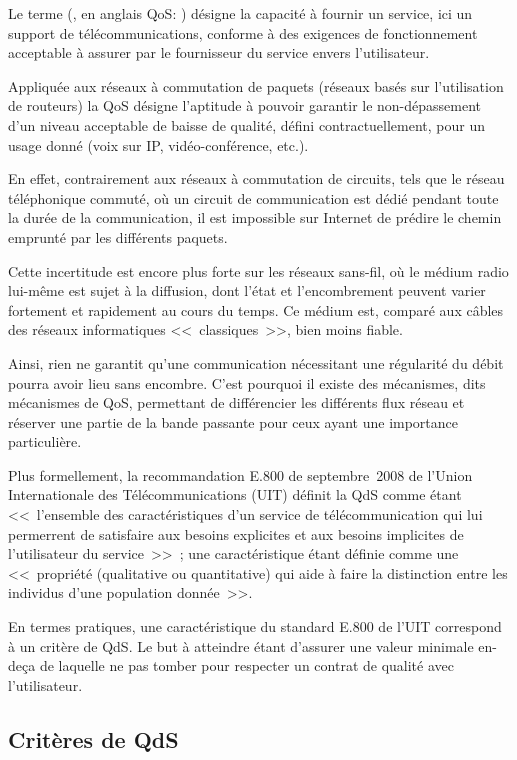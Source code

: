 Le terme  (, en anglais QoS:
) désigne la capacité à fournir un service,
ici un support de télécommunications, conforme à des exigences de
fonctionnement acceptable à assurer par le fournisseur du service
envers l'utilisateur.

Appliquée aux réseaux à commutation de paquets (réseaux basés sur
l'utilisation de routeurs) la QoS désigne l'aptitude à pouvoir garantir
le non-dépassement d'un niveau acceptable de baisse de qualité, défini
contractuellement, pour un usage donné (voix sur IP, vidéo-conférence, etc.).

En effet, contrairement aux réseaux à commutation de circuits, tels que
le réseau téléphonique commuté, où un circuit de communication est dédié
pendant toute la durée de la communication, il est impossible sur Internet
de prédire le chemin emprunté par les différents paquets.

Cette incertitude est encore plus forte sur les réseaux sans-fil,
où le médium radio lui-même est sujet à la diffusion, dont l'état
et l'encombrement peuvent varier fortement et rapidement au cours
du temps. Ce médium est, comparé aux câbles des réseaux informatiques
<<~classiques~>>, bien moins fiable.

Ainsi, rien ne garantit qu'une communication nécessitant une régularité
du débit pourra avoir lieu sans encombre. C'est pourquoi il existe des
mécanismes, dits mécanismes de QoS, permettant de différencier les
différents flux réseau et réserver une partie de la bande passante
pour ceux ayant une importance particulière.

Plus formellement, la recommandation E.800 de septembre~2008 de l'Union
Internationale des Télécommunications (UIT) définit la QdS comme étant
<<~l'ensemble des caractéristiques d'un service de télécommunication qui
lui permerrent de satisfaire aux besoins explicites et aux besoins
implicites de l'utilisateur du service~>>~; une caractéristique étant
définie comme une <<~propriété (qualitative ou quantitative) qui aide
à faire la distinction entre les individus d'une population donnée~>>.

En termes pratiques, une caractéristique du standard E.800 de l'UIT
correspond à un critère de QdS. Le but à atteindre étant d'assurer
une valeur minimale en-deça de laquelle ne pas tomber pour respecter
un contrat de qualité avec l'utilisateur.

\newpage


\subsection{Critères de QdS}
\label{SubsecCritQdS}

